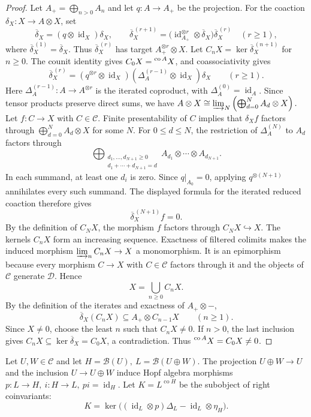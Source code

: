 \documentclass[11pt, a4paper]{article}
\numberwithin{equation}{section}
\newcommand{\C}{\mathcal C}
\newcommand{\D}{\mathcal D}
\newcommand{\B}{\mathcal B}
\DeclareMathOperator{\id}{id}
\DeclareMathOperator{\co}{co}
\begin{document}
\begin{proof}

 Let $A_+=\bigoplus_{n>0}A_n$ and let $q:A\to A_+$ be the projection.
For the coaction $\delta_X:X\to A\otimes X$, set
\[
 \overline\delta_X=(q\otimes\id_X)\delta_X,
 \qquad
 \overline\delta_X^{\,(r+1)}
 =\bigl(\id_{A_+}^{\otimes r}\otimes\overline\delta_X\bigr)
   \overline\delta_X^{\,(r)}
 \quad(r\geq1),
\]
where $\overline\delta_X^{\,(1)}=\overline\delta_X$.
Thus $\overline\delta_X^{\,(r)}$ has target $A_+^{\otimes r}\otimes X$.
 Let $C_nX=\ker\overline\delta_X^{\,(n+1)}$ for $n\geq0$.
The counit identity gives $C_0X=\prescript{\co A}{}{X}$,
and coassociativity gives
\[
 \overline\delta_X^{\,(r)}
 = (q^{\otimes r}\otimes\id_X)
   (\Delta_A^{(r-1)}\otimes\id_X)\delta_X
 \qquad(r\geq 1).
\]
Here $\Delta_A^{(r-1)}:A\to A^{\otimes r}$ is the iterated
coproduct, with $\Delta_A^{(0)}=\id_A$.
Since tensor products preserve direct sums, we have
$
 A\otimes X
 \cong\varinjlim_N
 \left(\bigoplus_{d=0}^{N}A_d\otimes X\right).
$
Let $f:C\to X$ with $C\in\C$.
Finite presentability of $C$ implies that $\delta_Xf$
factors through $\bigoplus_{d=0}^{N}A_d\otimes X$
for some $N$.
For $0\leq d\leq N$, the restriction of $\Delta_A^{(N)}$ to
$A_d$ factors through
\[
 \bigoplus_{\substack{d_1,\ldots,d_{N+1}\geq0\\
                     d_1+\cdots+d_{N+1}=d}}
 A_{d_1}\otimes\cdots\otimes A_{d_{N+1}}.
\]
In each summand, at least one $d_i$ is zero.
Since $q|_{A_0}=0$, applying $q^{\otimes(N+1)}$
annihilates every such summand.
The displayed formula for the iterated reduced coaction
therefore gives
\[
 \overline\delta_X^{\,(N+1)}f=0.
\]
By the definition of $C_NX$, the morphism $f$ factors
through $C_NX\hookrightarrow X$.
The kernels $C_nX$ form an increasing sequence.
Exactness of filtered colimits makes the induced morphism
$\varinjlim_n C_nX\to X$ a monomorphism.
It is an epimorphism because every morphism $C\to X$ with
$C\in\C$ factors through it and the objects of $\C$ generate $\D$.
Hence
\[
 X=\bigcup_{n\geq0}C_nX.
\]
By the definition of the iterates and exactness of $A_+\otimes-$,
\[
 \overline\delta_X(C_nX)\subseteq A_+\otimes C_{n-1}X
 \qquad(n\geq 1).
\]
Since $X\neq0$, choose the least $n$ such that $C_nX\neq0$.
If $n>0$, the last inclusion gives
$C_nX\subseteq\ker\overline\delta_X=C_0X$, a contradiction.
Thus $\prescript{\co A}{}{X}=C_0X\neq0$.
\end{proof}


Let $U,W\in\C$ and let
$
 H=\B(U),\ L=\B(U\oplus W).
$
The projection $U\oplus W\to U$ and the inclusion $U\to U\oplus W$
induce Hopf algebra morphisms
$
 p:L\longrightarrow H,\ i:H\longrightarrow L,
 \ pi=\id_H.
$
Let $K=L^{\co H}$ be the subobject of right coinvariants:
\[
 K=\ker\bigl((\id_L\otimes p)\Delta_L
                   -\id_L\otimes\eta_H\bigr).
\]
\end{document}
